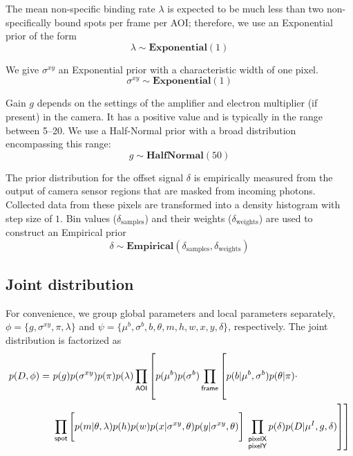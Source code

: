 The mean non-specific binding rate $\lambda$ is expected to be much less than two non-specifically bound spots per frame per AOI; therefore, we use an Exponential prior of the form
%
\begin{equation}
    \lambda \sim \mathbf{Exponential}(1)
\end{equation}

We give $\sigma^{xy}$ an Exponential prior with a characteristic width of one pixel.
%
\begin{equation}
    \sigma^{xy} \sim \mathbf{Exponential}(1)
\end{equation}

Gain $g$ depends on the settings of the amplifier and electron multiplier (if present) in the camera. It has a positive value and is typically in the range between 5--20. We use a Half-Normal prior with a broad distribution encompassing this range:
%
\begin{equation}
    g \sim \mathbf{HalfNormal}(50)
\end{equation}

The prior distribution for the offset signal $\delta$ is empirically measured from the output of camera sensor regions that are masked from incoming photons. Collected data from these pixels are transformed into a density histogram with step size of $1$. Bin values ($\delta_\mathrm{samples}$) and their weights ($\delta_\mathrm{weights}$) are used to construct an Empirical prior
%
\begin{equation}
    \delta \sim \mathbf{Empirical}(\delta_\mathrm{samples}, \delta_\mathrm{weights})
\end{equation}



\subsection*{Joint distribution}

For convenience, we group global parameters and local parameters separately, $\phi = \{ g, \sigma^{xy}, \pi, \lambda \}$ and $\psi = \{ \mu^b, \sigma^b, b, \theta, m, h, w, x, y, \delta \}$, respectively. The joint distribution is factorized as
%
\begin{equation}
\begin{aligned}
    p(D, \phi) =~&p(g) p(\sigma^{xy}) p(\pi) p(\lambda) \prod_{\mathsf{AOI}} \left[ p(\mu^b) p(\sigma^b) \prod_{\mathsf{frame}} \left[ \vphantom{\prod_{F}} p(b | \mu^b, \sigma^b) p(\theta | \pi) \vphantom{\prod_{\substack{\mathsf{pixelX} \\ \mathsf{pixelY}}}} \cdot \right. \right. \\
    &\prod_{\mathsf{spot}} \left[ \vphantom{\prod_{F}} p(m | \theta, \lambda) p(h) p(w) p(x | \sigma^{xy}, \theta) p(y | \sigma^{xy}, \theta) \right] \left. \left. \prod_{\substack{\mathsf{pixelX} \\ \mathsf{pixelY}}} p(\delta) p(D | \mu^I, g, \delta) \right] \right]
\end{aligned}
\end{equation}

